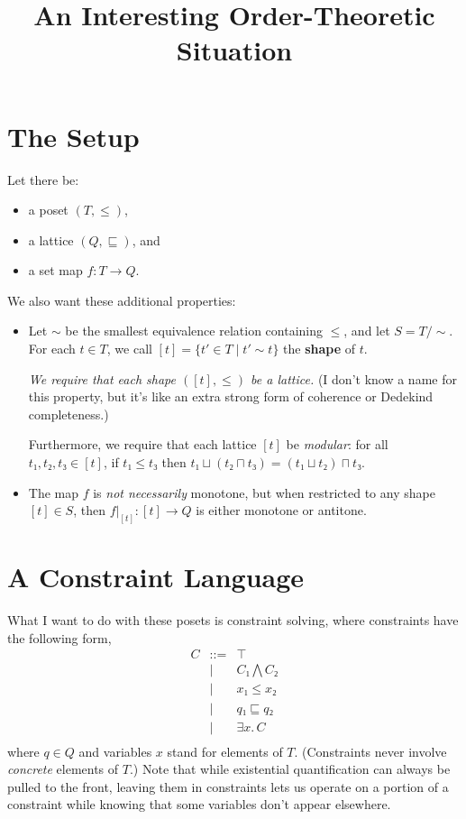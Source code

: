 \documentclass[11pt]{article}
\title{An Interesting Order-Theoretic Situation}
\begin{document}
\maketitle

\section*{The Setup}

Let there be:
\begin{itemize}
  \item a poset $(T, ≤)$,
  \item a lattice $(Q, ⊑)$, and
  \item a set map $f\colon T → Q$.
\end{itemize}

We also want these additional properties:
\begin{itemize}
\item
Let $\sim$ be the smallest equivalence relation containing $≤$,
and let $S = T/{\sim}$. For each $t ∈ T$,
we call $[t] = \{ t' ∈ T \mathrel\vert t' \sim t \}$ the \textbf{shape} of $t$.

\emph{We require that each shape $([t], ≤)$ be a lattice.}
(I don't know a name for this property, but it's like an extra strong
form of coherence or Dedekind completeness.)

Furthermore, we require that each lattice $[t]$ be \emph{modular}:
for all $t₁, t₂, t₃ ∈ [t]$,
if $t₁ ≤ t₃$ then $t₁ ⊔ (t₂ ⊓ t₃) = (t₁ ⊔ t₂) ⊓ t₃$.

\item 
  The map $f$ is \emph{not necessarily} monotone, but when
  restricted to any shape $[t] ∈ S$, then
  $f|_{[t]}\colon [t] → Q$ is either monotone or antitone.
\end{itemize}

\section*{A Constraint Language}

What I want to do with these posets is constraint solving, where
constraints have the following form,
\[
\begin{array}{rcl}
    C & \mathop{::=} & ⊤ \\
      & | & C₁ ⋀ C₂      \\
      & | & x₁ ≤ x₂      \\
      & | & q₁ ⊑ q₂      \\
      & | & ∃ x.\, C     \\
\end{array}
\]
where $q ∈ Q$ and
variables $x$ stand for elements of $T$.
(Constraints never involve \emph{concrete} elements of $T$.)
Note that while existential quantification can always be pulled to the
front, leaving them in constraints lets us operate on a portion of a
constraint while knowing that some variables don't appear elsewhere.
\end{document}
